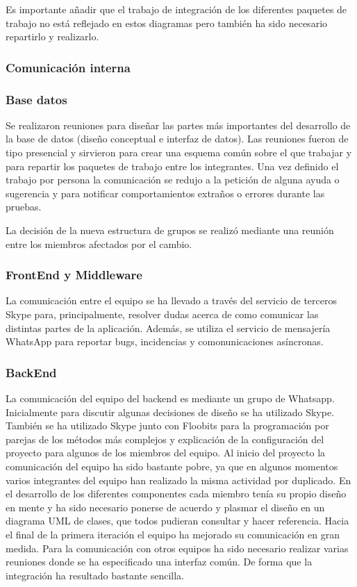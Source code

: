Es importante añadir que el trabajo de integración de los diferentes paquetes de trabajo no está reflejado en estos diagramas pero también ha sido necesario repartirlo y realizarlo.
\subsubsection{Comunicación interna}
\subsubsection*{Base datos}
Se realizaron reuniones para diseñar las partes más importantes del desarrollo de la base de datos (diseño conceptual e interfaz de datos). Las reuniones fueron de tipo presencial y sirvieron para crear una esquema común sobre el que trabajar y para repartir los paquetes de trabajo entre los integrantes. Una vez definido el trabajo por persona la comunicación se redujo a la petición de alguna ayuda o sugerencia y para notificar comportamientos extraños o errores durante las pruebas.

La decisión de la nueva estructura de grupos se realizó mediante una reunión entre los miembros afectados por el cambio.
\subsubsection*{FrontEnd y Middleware}
La comunicación entre el equipo se ha llevado a través del servicio de terceros Skype para, principalmente, resolver dudas acerca de como comunicar las distintas partes de la aplicación. Además, se utiliza el servicio de mensajería WhatsApp para reportar bugs, incidencias y comonunicaciones asíncronas.
\subsubsection*{BackEnd}
La comunicación del equipo del backend es mediante un grupo de Whatsapp. Inicialmente para discutir algunas decisiones de diseño se ha utilizado Skype. También se ha utilizado Skype junto con Floobits para la programación por parejas de los métodos más complejos y explicación de la configuración del proyecto para algunos de los miembros del equipo.
Al inicio del proyecto la comunicación del equipo ha sido bastante pobre, ya que en algunos momentos varios integrantes del equipo han realizado la misma actividad por duplicado. En el desarrollo de los diferentes componentes cada miembro tenía su propio diseño en mente y ha sido necesario ponerse de acuerdo y plasmar el diseño en un diagrama UML de clases, que todos pudieran consultar y hacer referencia. Hacia el final de la primera iteración el equipo ha mejorado su comunicación en gran medida.
Para la comunicación con otros equipos ha sido necesario realizar varias reuniones donde se ha especificado una interfaz común. De forma que la integración ha resultado bastante sencilla.
